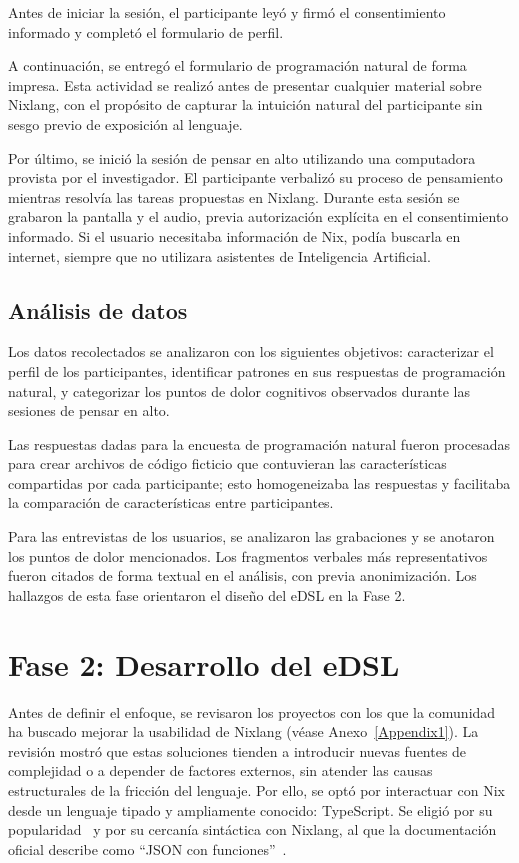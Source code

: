 Antes de iniciar la sesión, el participante leyó y firmó el consentimiento
informado y completó el formulario de perfil.

A continuación, se entregó el formulario de programación natural de forma
impresa. Esta actividad se realizó antes de presentar cualquier material sobre
Nixlang, con el propósito de capturar la intuición natural del participante sin
sesgo previo de exposición al lenguaje.

Por último, se inició la sesión de pensar en alto utilizando una computadora
provista por el investigador. El participante verbalizó su proceso de
pensamiento mientras resolvía las tareas propuestas en Nixlang. Durante esta
sesión se grabaron la pantalla y el audio, previa autorización explícita en el
consentimiento informado. Si el usuario necesitaba información de Nix, podía buscarla en internet, siempre que no utilizara asistentes de Inteligencia Artificial.

\subsection{Análisis de datos}

Los datos recolectados se analizaron con los siguientes objetivos: caracterizar el
perfil de los participantes, identificar patrones en sus respuestas de
programación natural, y categorizar los puntos de dolor cognitivos observados
durante las sesiones de pensar en alto.

Las respuestas dadas para la encuesta de programación natural fueron procesadas para crear archivos de código ficticio que contuvieran las características compartidas por cada participante; esto homogeneizaba las respuestas y facilitaba la comparación de características entre participantes.

Para las entrevistas de los usuarios, se analizaron las grabaciones y se anotaron los puntos de dolor mencionados. Los fragmentos verbales más representativos fueron citados de forma textual en el análisis, con previa
anonimización. Los hallazgos de esta fase orientaron el diseño del eDSL en la
Fase 2.

\section{Fase 2: Desarrollo del eDSL}

Antes de definir el enfoque, se revisaron los proyectos con los que la comunidad ha buscado mejorar la usabilidad de Nixlang (véase Anexo~\ref{Appendix1}). La revisión mostró que estas soluciones tienden a introducir nuevas fuentes de complejidad o a depender de factores externos, sin atender las causas estructurales de la fricción del lenguaje. Por ello, se optó por interactuar con Nix desde un lenguaje tipado y ampliamente conocido: TypeScript. Se eligió por su popularidad~\cite{stackoverflowMostPopularTechnologies} y por su cercanía sintáctica con Nixlang, al que la documentación oficial describe como ``JSON con funciones''~\cite{NixdevDocumentation}.

